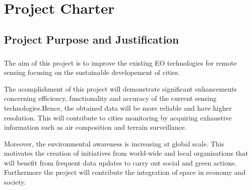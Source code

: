 \chapter{Project Charter}

\section{Project Purpose and Justification}

\paragraph{} The aim of this project is to improve the existing EO technologies for remote sensing focusing on the sustainable developement of cities. 

The acomplishment of this project will demonstrate significant enhancements concerning efficiency, functionality and accuracy of the current sensing technologies.Hence, the obtained data will be more reliable and have higher resolution. This will contribute to cities monitoring by acquiring exhaustive information such as air composition and terrain surveillance. 

Moreover, the environmental awareness is increasing at global scale. This motivates the creation of initiatives from world-wide and local organisations that will benefit from frequent data updates to carry out social and green actions. Furthermore the project will contribute the integration of space in economy and society.




